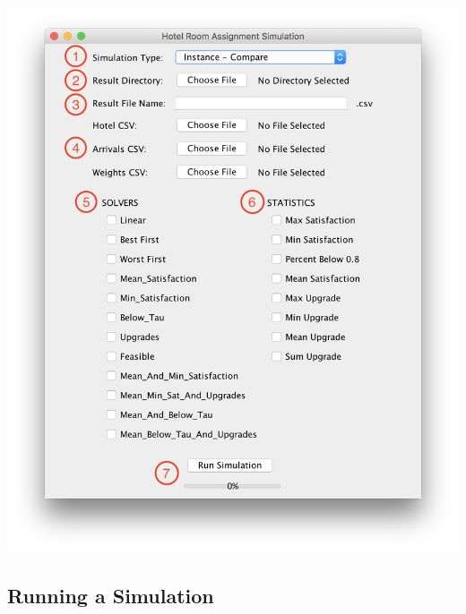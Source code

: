 \documentclass[11 pt]{article}
\begin{document}
\begin{center}
\includegraphics[scale=0.38]{images/appScreen.png}
\end{center}

\subsection{Running a Simulation}
\end{document}
